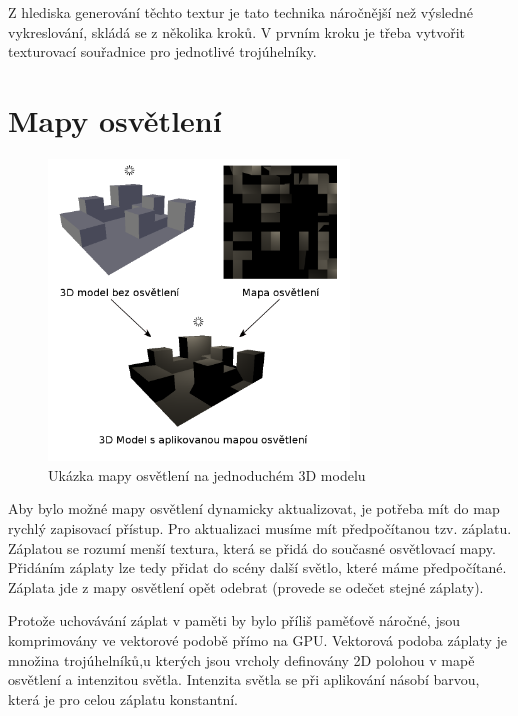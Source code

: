 \documentclass[11pt,twoside,a4paper]{book}
\begin{document}
Z hlediska generování těchto textur je tato technika náročnější než výsledné vykreslování, skládá se z několika kroků. V prvním kroku je třeba vytvořit texturovací souřadnice pro jednotlivé trojúhelníky.

\section{Mapy osvětlení}
\begin{center}
\begin{figure}[h!]
\includegraphics[width=80mm]{figures/lmapply.png}
\caption{Ukázka mapy osvětlení na jednoduchém 3D modelu}
\end{figure}
\end{center}
\newpage

Aby bylo možné mapy osvětlení dynamicky aktualizovat, je potřeba mít do map rychlý zapisovací přístup. Pro aktualizaci musíme mít předpočítanou tzv. záplatu. Záplatou se rozumí menší textura, která se přidá do současné osvětlovací mapy. Přidáním záplaty lze tedy přidat do scény další světlo, které máme předpočítané. Záplata jde z mapy osvětlení opět odebrat (provede se odečet stejné záplaty).

Protože uchovávání záplat v paměti by bylo příliš paměťově náročné, jsou komprimovány ve vektorové podobě přímo na GPU. Vektorová podoba záplaty je množina trojúhelníků,\linebreak u kterých jsou vrcholy definovány 2D polohou v mapě osvětlení a intenzitou světla. Intenzita světla se při aplikování násobí barvou, která je pro celou záplatu konstantní.
\end{document}
